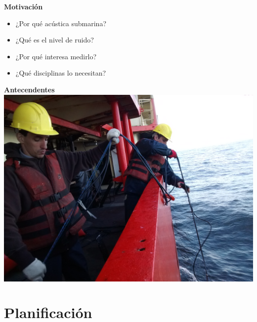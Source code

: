 \documentclass[11pt]{beamer}
\begin{document}
\begin{frame}{\textbf{\LARGE{Motivación}}}
\fontsize{18pt}{18}\selectfont
	\vspace{-.7cm}
	\centering
	\begin{itemize}
	\item ¿Por qué acústica submarina?
	\vspace{15px}
	\item ¿Qué es el nivel de ruido?
	\vspace{15px}
	\item ¿Por qué interesa medirlo?
	\vspace{15px}	
	\item ¿Qué disciplinas lo necesitan?
	\end{itemize}
\end{frame}

\begin{frame}{\textbf{\LARGE{Antecendentes}}}
	\vspace{-.6cm}
		\includegraphics[width=.9\textwidth]{./imagenes/antecedentes.jpg}
\end{frame}

\section{Planificación}

\end{document}
